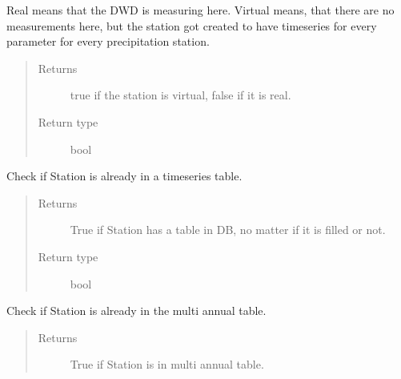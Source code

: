\documentclass[letterpaper,10pt,english]{sphinxmanual}
\begin{document}
\begin{fulllineitems}
\begin{fulllineitems}
\sphinxAtStartPar
Real means that the DWD is measuring here.
Virtual means, that there are no measurements here, but the station got created to have timeseries for every parameter for every precipitation station.
\begin{quote}\begin{description}
\item[{Returns}] \leavevmode
\sphinxAtStartPar
true if the station is virtual, false if it is real.

\item[{Return type}] \leavevmode
\sphinxAtStartPar
bool

\end{description}\end{quote}

\end{fulllineitems}


\begin{fulllineitems}
\label{\detokenize{weatherDB:weatherDB.station.StationBase.isin_db}}
\sphinxAtStartPar
Check if Station is already in a timeseries table.
\begin{quote}\begin{description}
\item[{Returns}] \leavevmode
\sphinxAtStartPar
True if Station has a table in DB, no matter if it is filled or not.

\item[{Return type}] \leavevmode
\sphinxAtStartPar
bool

\end{description}\end{quote}

\end{fulllineitems}


\begin{fulllineitems}
\label{\detokenize{weatherDB:weatherDB.station.StationBase.isin_ma}}
\sphinxAtStartPar
Check if Station is already in the multi annual table.
\begin{quote}\begin{description}
\item[{Returns}] \leavevmode
\sphinxAtStartPar
True if Station is in multi annual table.


\end{description}
\end{quote}
\end{fulllineitems}
\end{fulllineitems}
\end{document}
